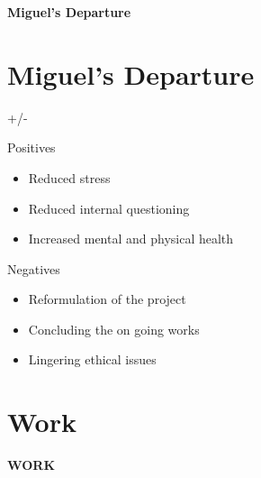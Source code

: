 \documentclass[aspectratio=169]{beamer}
\author{\authorlabel}
\newcommand{\mig}{\color{Pink}\huge{\textbf{Miguel's Departure}}}
\newcommand{\work}{\color{Pink}\huge{\textbf{WORK}}}
\begin{document}



\begin{frame}
  \centering
  \mig
\end{frame}

\section{Miguel's Departure}

\begin{frame}{+/-}
  \begin{minipage}{0.5\textwidth}
    \color{Pink} Positives
    \begin{itemize}
      \item Reduced stress
      \item Reduced internal questioning
      \item Increased mental and physical health
    \end{itemize}
  \end{minipage}%
  \begin{minipage}{0.5\textwidth}
  {
    \color{Pink} Negatives
    \begin{itemize}
      \item Reformulation of the project 
      \item Concluding the on going works
      \item Lingering ethical issues
    \end{itemize}
  }
  \end{minipage}
\end{frame}

\section{Work}

\begin{frame}
  \centering
  \work
\end{frame}
\end{document}
